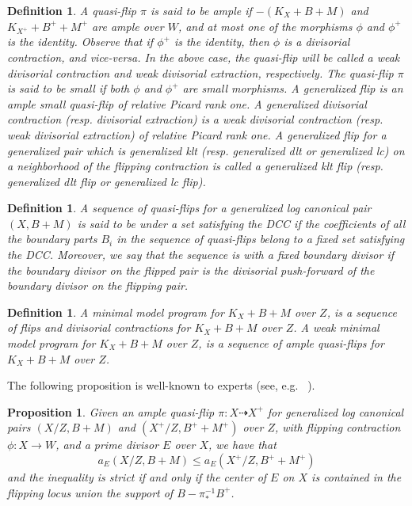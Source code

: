 \documentclass{amsart}
\newtheorem{proposition}[theorem]{Proposition}
\newtheorem{definition}[theorem]{Definition}
\theoremstyle{remark}
\numberwithin{equation}{section}
\begin{document}
\begin{definition}
{\em 
A quasi-flip $\pi$ is said to be {\em ample} if $-(K_X+B+M)$ and $K_{X^{+}}+B^{+}+M^{+}$
are ample over $W$,
and at most one of the morphisms $\phi$ and $\phi^+$ is the identity.
Observe that if $\phi^+$ is the identity, then $\phi$ is a divisorial contraction, and vice-versa.
In the above case, the quasi-flip will be called a {\em weak divisorial contraction} and
{\em weak divisorial extraction}, respectively.
The quasi-flip $\pi$ is said to be {\em small} if both $\phi$ and $\phi^+$ are small morphisms.
A {\em generalized flip} is an ample small quasi-flip of relative Picard rank one. 
A {\em generalized divisorial contraction} (resp. {\em divisorial extraction}) is a 
weak divisorial contraction (resp. weak divisorial extraction) of relative Picard rank one.
A generalized flip for a generalized pair which is generalized klt (resp. generalized dlt or generalized lc)
on a neighborhood of the flipping contraction is called a {\em generalized klt flip} (resp. {\em generalized dlt flip} or {\em generalized lc flip}).
}
\end{definition}

\begin{definition}
{\em 
A sequence of quasi-flips for a generalized log canonical pair $(X,B+M)$ is said to be {\em under a set satisfying the DCC}
if the coefficients of all the boundary parts $B_i$ in the sequence of quasi-flips belong to a fixed set satisfying the DCC. Moreover, we say that the sequence is with a {\em fixed boundary divisor}
if the boundary divisor on the flipped pair is the divisorial push-forward of the boundary divisor on the 
flipping pair.
}
\end{definition}

\begin{definition}
{\em
A {\em minimal model program} for $K_X+B+M$ over $Z$, is a sequence 
of flips and divisorial contractions for $K_X+B+M$ over $Z$.
A {\em weak minimal model program} for $K_X+B+M$ over $Z$, 
is a sequence of ample quasi-flips for $K_X+B+M$ over $Z$.}
\end{definition}

The following proposition is well-known to experts (see, e.g. ~\cite[Monotonicity]{Shok04}).

\begin{proposition}\label{monotonicity}
Given an ample quasi-flip $\pi \colon X \dashrightarrow X^+$ for generalized log canonical pairs 
$(X/Z,B+M)$ and $(X^+/Z,B^{+}+M^{+})$ over $Z$, with flipping contraction 
$\phi \colon X \rightarrow W$, and a prime divisor $E$ over $X$, we have that
\[
a_E(X/Z,B+M) \leq a_E(X^+/Z,B^{+}+M^{+})
\]
and the inequality is strict if and only if the center of $E$ on $X$ is contained in the flipping locus union the support of $B-\pi ^{-1}_* B^+$.
\end{proposition}
\end{document}
